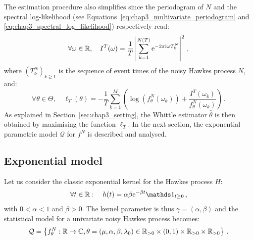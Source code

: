           The estimation procedure also simplifies since
          the periodogram of $N$ and the spectral log-likelihood (see Equations~\eqref{eq:chap3_multivariate_periodogram} and \eqref{eq:chap3_spectral_log_likelihood}) respectively read:
          \[
            \forall \omega \in {\mathbb R}, \quad
            I^T(\omega) = \frac{1}{T}\left\lvert \sum_{k=1}^{N(T)}{\mathrm{e}^{-2\pi \mathrm{i} \omega T_k^N}}\right\rvert^2\,,
          \]
          where $(T_k^{N})_{k\geq1}$ is the sequence of event times of the noisy Hawkes process $N$,
          and:
          \begin{equation}\label{eq:chap3_univariate_log_likelihood}
            \forall \theta \in \Theta, \quad
          	\ell_T(\theta) = -\frac{1}{T}\sum_{k=1}^{M}{\left(\log\left(f_\theta^N(\omega_k)\right) + \frac{I^T(\omega_k)}{f_\theta^N(\omega_k)}\right)}\,.
		      \end{equation}
          As explained in Section~\ref{sec:chap3_setting}, the Whittle estimator $\hat \theta$ is then obtained by maximising the function $\ell_T$.
          In the next section, the exponential parametric model $\mathcal Q$ for $f^N$ is described and analysed.


      \subsection{Exponential model}\label{sec:chap3_expon_1d}
        Let us consider the classic exponential kernel for the Hawkes process $H$:
          \begin{equation}\label{eq:chap3_exp_kernel_1d}
            \forall t \in \RR: \quad
            h(t) = \alpha\beta \mathrm{e}^{-\beta t} \II_{t \ge 0}\,,
          \end{equation}
          with $0 < \alpha < 1$ and $\beta > 0$.
          The kernel parameter is thus $\gamma = (\alpha, \beta)$ and the statistical model for a univariate noisy Hawkes process becomes:
          \[
        		\mathcal Q = \left\{
        		  f^N_\theta : {\mathbb R} \to \mathbb C, 
              \theta = (\mu, \alpha, \beta, \lambda_0) \in {\mathbb R}_{>0}\times (0,1) \times {\mathbb R}_{>0} \times {\mathbb R}_{>0}
            \right\}\,.
          \]
          
